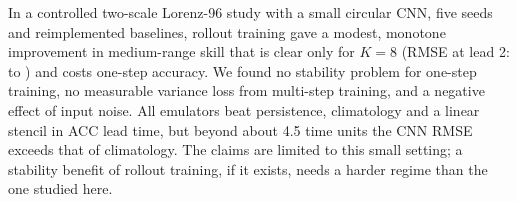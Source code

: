 In a controlled two-scale Lorenz-96 study with a small circular CNN, five seeds and reimplemented baselines, rollout training gave a modest, monotone improvement in medium-range skill that is clear only for $K{=}8$ (RMSE at lead 2:  to ) and costs one-step accuracy. We found no stability problem for one-step training, no measurable variance loss from multi-step training, and a negative effect of input noise. All emulators beat persistence, climatology and a linear stencil in ACC lead time, but beyond about 4.5 time units the CNN RMSE exceeds that of climatology. The claims are limited to this small setting; a stability benefit of rollout training, if it exists, needs a harder regime than the one studied here.
